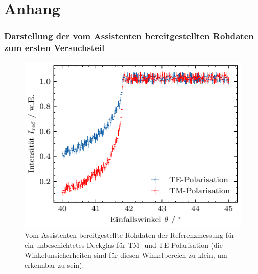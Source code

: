 \section{Anhang}\label{sec:anhang}
\subsubsection*{Darstellung der vom Assistenten bereitgestellten Rohdaten zum ersten Versuchsteil}
\begin{figure}[H]
	\centering
	\includegraphics[width=0.4\linewidth]{../figs/referenz.pdf}
	\caption{Vom Assistenten bereitgestellte Rohdaten der Referenzmessung für ein unbeschichtetes Deckglas für TM- und TE-Polarisation (die Winkelunsicherheiten sind für diesen Winkelbereich zu klein, um erkennbar zu sein).}
	\label{fig:referenz}
\end{figure}
